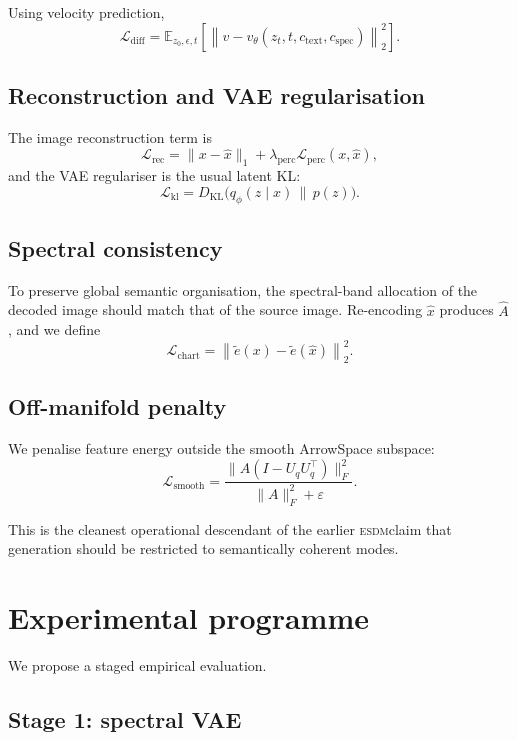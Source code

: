 \documentclass[11pt]{article}
\newcommand{\ESDM}{\textsc{esdm}}
\newcommand{\Uq}{U_q}
\begin{document}
Using velocity prediction,
\[\mathcal{L}_{\mathrm{diff}} = \mathbb{E}_{z_0,\epsilon,t} \left[ \left\| v - v_\theta(z_t,t,c_{\mathrm{text}},c_{\mathrm{spec}}) \right\|_2^2 \right].\]

\subsection{Reconstruction and VAE regularisation}
\label{sec:loss_rec}

The image reconstruction term is
\[\mathcal{L}_{\mathrm{rec}} = \|x-\hat x\|_1 + \lambda_{\mathrm{perc}}\mathcal{L}_{\mathrm{perc}}(x,\hat x),\]
and the VAE regulariser is the usual latent KL:
\[\mathcal{L}_{\mathrm{kl}} = D_{\mathrm{KL}}\bigl(q_\phi(z \mid x)\,\|\,p(z)\bigr).\]

\subsection{Spectral consistency}
\label{sec:loss_chart}

To preserve global semantic organisation, the spectral-band allocation of the
decoded image should match that of the source image. Re-encoding $\hat x$
produces $\hat A$, and we define
\[\mathcal{L}_{\mathrm{chart}} = \left\| \tilde e(x) - \tilde e(\hat x) \right\|_2^2.\]

\subsection{Off-manifold penalty}
\label{sec:loss_smooth}

We penalise feature energy outside the smooth ArrowSpace subspace:
\[\mathcal{L}_{\mathrm{smooth}} = \frac{ \|A(I-\Uq\Uq^\top)\|_F^2 }{ \|A\|_F^2 + \varepsilon }.\]

This is the cleanest operational descendant of the earlier \ESDM claim that
generation should be restricted to semantically coherent modes.

\section{Experimental programme}
\label{sec:experiments}

We propose a staged empirical evaluation.

\subsection{Stage 1: spectral VAE}
\label{sec:stage1}
\end{document}
